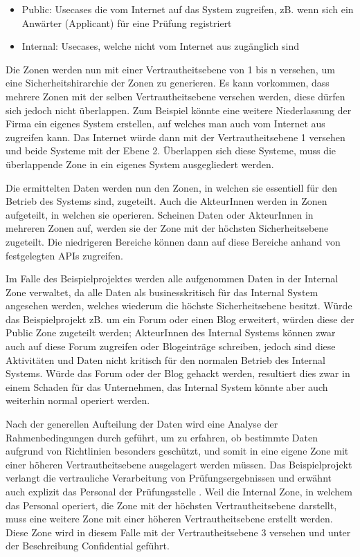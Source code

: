 \begin{itemize}
  \item Public: Usecases die vom Internet auf das System zugreifen, zB. wenn sich ein Anwärter (Applicant) für eine Prüfung registriert
  \item Internal: Usecases, welche nicht vom Internet aus zugänglich sind
\end{itemize}

Die Zonen werden nun mit einer Vertrautheitsebene von 1 bis n versehen, um eine Sicherheitshirarchie der Zonen zu generieren. Es kann vorkommen, dass mehrere Zonen mit der selben Vertrautheitsebene versehen werden, diese dürfen sich jedoch nicht überlappen. Zum Beispiel könnte eine weitere Niederlassung der Firma ein eigenes System erstellen, auf welches man auch vom Internet aus zugreifen kann. Das Internet würde dann mit der Vertrautheitsebene 1 versehen und beide Systeme mit der Ebene 2. Überlappen sich diese Systeme, muss die überlappende Zone in ein eigenes System ausgegliedert werden.

Die ermittelten Daten werden nun den Zonen, in welchen sie essentiell für den Betrieb des Systems sind, zugeteilt. Auch die AkteurInnen werden in Zonen aufgeteilt, in welchen sie operieren. Scheinen Daten oder AkteurInnen in mehreren Zonen auf, werden sie der Zone mit der höchsten Sicherheitsebene zugeteilt. Die niedrigeren Bereiche können dann auf diese Bereiche anhand von festgelegten APIs zugreifen.

Im Falle des Beispielprojektes werden alle aufgenommen Daten in der Internal Zone verwaltet, da alle Daten als businesskritisch für das Internal System angesehen werden, welches wiederum die höchste Sicherheitsebene besitzt. Würde das Beispielprojekt zB. um ein Forum oder einen Blog erweitert, würden diese der Public Zone zugeteilt werden; AkteurInnen des Internal Systems können zwar auch auf diese Forum zugreifen oder Blogeinträge schreiben, jedoch sind diese Aktivitäten und Daten nicht kritisch für den normalen Betrieb des Internal Systems. Würde das Forum oder der Blog gehackt werden, resultiert dies zwar in einem Schaden für das Unternehmen, das Internal System könnte aber auch weiterhin normal operiert werden.

Nach der generellen Aufteilung der Daten wird eine Analyse der Rahmenbedingungen durch geführt, um zu erfahren, ob bestimmte Daten aufgrund von Richtlinien besonders geschützt, und somit in eine eigene Zone mit einer höheren Vertrautheitsebene ausgelagert werden müssen. Das Beispielprojekt verlangt die vertrauliche Verarbeitung von Prüfungsergebnissen und erwähnt auch explizit das Personal der Prüfungsstelle \cite[7.3]{ISO_CERT}. Weil die Internal Zone, in welchem das Personal operiert, die Zone mit der höchsten Vertrautheitsebene darstellt, muss eine weitere Zone mit einer höheren Vertrautheitsebene erstellt werden. Diese Zone wird in diesem Falle mit der Vertrautheitsebene 3 versehen und unter der Beschreibung Confidential geführt.

